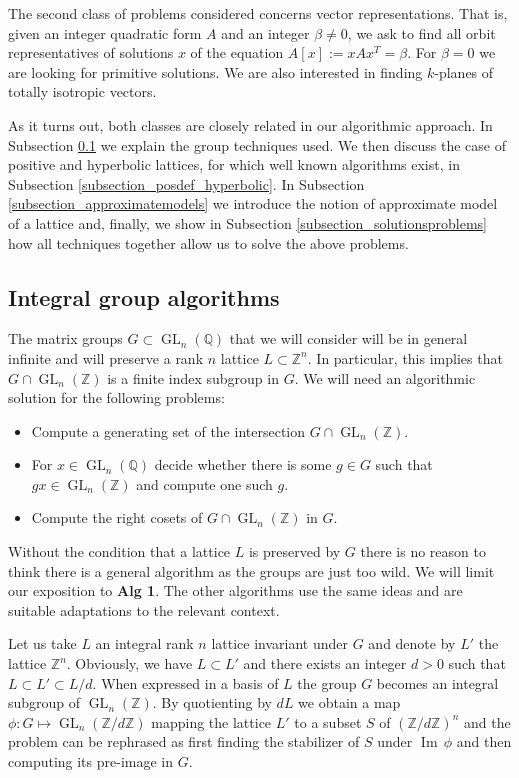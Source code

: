 \documentclass[a4paper,11pt]{article}
\newcommand{\QQ}{\mathbb Q}
\newcommand{\ZZ}{\mathbb Z}
\newcommand{\GL}{\mathop{\mathrm {GL}}\nolimits}
\renewcommand{\Im}{\mathop{\mathrm {Im}}\nolimits}
\begin{document}
The second class of problems considered concerns vector representations.
That is, given an integer quadratic form $A$ and an integer $\beta\not= 0$, we ask to find all orbit representatives of
solutions $x$ of the equation $A[x] := x A x^T = \beta$. For $\beta = 0$ we are looking for primitive solutions.
We are also interested in finding $k$-planes of totally isotropic vectors.

As it turns out, both classes are closely related in our algorithmic approach. In Subsection \ref{subsection_int_group_algo}
we explain the group techniques used.  We then discuss the case of positive and hyperbolic lattices, for which
well known algorithms exist, in Subsection \ref{subsection_posdef_hyperbolic}.
In Subsection \ref{subsection_approximatemodels} we introduce the notion of approximate model of a lattice and,
finally, we show in Subsection \ref{subsection_solutionsproblems} how all techniques
together allow us to solve the above problems.

\subsection{Integral group algorithms}\label{subsection_int_group_algo}
The matrix groups $G \subset \GL_n(\QQ)$ that we will consider will be in general infinite
and will preserve a rank $n$ lattice $L\subset \ZZ^n$. In particular, this implies that $G\cap \GL_n(\ZZ)$
is a finite index subgroup in $G$.
We will need an algorithmic solution for the following problems:
\begin{itemize}
\item[{\bf Alg 1}] Compute a generating set of the intersection $G \cap \GL_n(\ZZ)$.
\item[{\bf Alg 2}] For $x \in \GL_n(\QQ)$ decide whether there is some $g\in G$ such that $g x\in \GL_n(\ZZ)$ and compute one such $g$.
\item[{\bf Alg 3}] Compute the right cosets of $G\cap \GL_n(\ZZ)$ in $G$.
\end{itemize}
Without the condition that a lattice $L$ is preserved by $G$ there is no reason to think there is a general algorithm as the groups are just too wild.
We will limit our exposition to {\bf Alg 1}. The other algorithms use the same ideas and are suitable adaptations
to the relevant context.

Let us take $L$ an integral rank $n$ lattice invariant under $G$ and denote by $L'$ the lattice $\ZZ^n$.
Obviously, we have $L\subset L'$ and there exists an integer $d>0$ such that $L \subset L' \subset L / d$.
When expressed in a basis of $L$ the group $G$ becomes an integral subgroup of $\GL_n(\ZZ)$.
By quotienting by $dL$ we obtain a map $\phi: G \mapsto \GL_n(\ZZ / d \ZZ)$ mapping the lattice $L'$ to a subset $S$
 of $(\ZZ /d \ZZ)^n$
 and the problem can be rephrased as first finding the stabilizer of $S$ under $\Im\,\phi$ and then computing
its pre-image in $G$.
\end{document}
